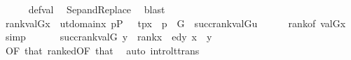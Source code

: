 \begin{isabellebody}
\ \ \ \ \isamarkupfalse%
\ def{\isacharunderscore}{\kern0pt}val\ \isamarkupfalse%
\ Sep{\isacharunderscore}{\kern0pt}and{\isacharunderscore}{\kern0pt}Replace\ \isamarkupfalse%
\ blast\isanewline
\ \ \isamarkupfalse%
\isanewline
\ \ \isamarkupfalse%
\ {\isachardoublequoteopen}rank{\isacharparenleft}{\kern0pt}val{\isacharparenleft}{\kern0pt}G{\isacharcomma}{\kern0pt}x{\isacharparenright}{\kern0pt}{\isacharparenright}{\kern0pt}\ {\isacharequal}{\kern0pt}\ {\isacharparenleft}{\kern0pt}{\isasymUnion}u{\isasymin}{\isacharbraceleft}{\kern0pt}t{\isasymin}domain{\isacharparenleft}{\kern0pt}x{\isacharparenright}{\kern0pt}{\isachardot}{\kern0pt}\ {\isasymexists}p{\isasymin}P\ {\isachardot}{\kern0pt}\ \ {\isasymlangle}t{\isacharcomma}{\kern0pt}p{\isasymrangle}{\isasymin}x\ {\isasymand}\ p\ {\isasymin}\ G\ {\isacharbraceright}{\kern0pt}{\isachardot}{\kern0pt}\ succ{\isacharparenleft}{\kern0pt}rank{\isacharparenleft}{\kern0pt}val{\isacharparenleft}{\kern0pt}G{\isacharcomma}{\kern0pt}u{\isacharparenright}{\kern0pt}{\isacharparenright}{\kern0pt}{\isacharparenright}{\kern0pt}{\isacharparenright}{\kern0pt}{\isachardoublequoteclose}\isanewline
\ \ \ \ \isamarkupfalse%
\ rank{\isacharbrackleft}{\kern0pt}of\ {\isachardoublequoteopen}val{\isacharparenleft}{\kern0pt}G{\isacharcomma}{\kern0pt}x{\isacharparenright}{\kern0pt}{\isachardoublequoteclose}{\isacharbrackright}{\kern0pt}\ \isamarkupfalse%
\ simp\isanewline
\ \ \isamarkupfalse%
\isanewline
\ \ \isamarkupfalse%
\ {\isachardoublequoteopen}succ{\isacharparenleft}{\kern0pt}rank{\isacharparenleft}{\kern0pt}val{\isacharparenleft}{\kern0pt}G{\isacharcomma}{\kern0pt}\ y{\isacharparenright}{\kern0pt}{\isacharparenright}{\kern0pt}{\isacharparenright}{\kern0pt}\ {\isasymle}\ rank{\isacharparenleft}{\kern0pt}x{\isacharparenright}{\kern0pt}{\isachardoublequoteclose}\ \ {\isachardoublequoteopen}ed{\isacharparenleft}{\kern0pt}y{\isacharcomma}{\kern0pt}\ x{\isacharparenright}{\kern0pt}{\isachardoublequoteclose}\ \ y\ \isanewline
\ \ \ \ \isamarkupfalse%
\ {}{\isacharbrackleft}{\kern0pt}OF\ that{\isacharbrackright}{\kern0pt}\ rank{\isacharunderscore}{\kern0pt}ed{\isacharbrackleft}{\kern0pt}OF\ that{\isacharbrackright}{\kern0pt}\ \isamarkupfalse%
\ {\isacharparenleft}{\kern0pt}auto\ intro{\isacharcolon}{\kern0pt}lt{\isacharunderscore}{\kern0pt}trans{}{\isacharparenright}{\kern0pt}\isanewline
\ \ \isamarkupfalse%

\end{isabellebody}
